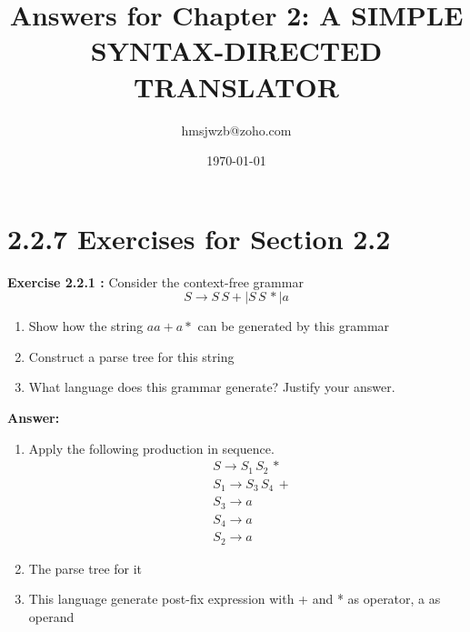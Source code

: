 \documentclass{article}
\title{Answers for Chapter 2: A SIMPLE SYNTAX-DIRECTED TRANSLATOR}
\author{hmsjwzb@zoho.com}
\date{\today}
\begin{document}
	
\maketitle
\newpage
\section*{2.2.7 Exercises for Section 2.2}

\textbf{Exercise 2.2.1 :} Consider the context-free grammar
\[
S \rightarrow S\, S + \mid S\, S\, * \mid a
\]

\begin{enumerate}[label=\alph*)]
	\item Show how the string \(aa+a*\) can be generated by this grammar
	\item Construct a parse tree for this string
	\item What language does this grammar generate? Justify your answer.
\end{enumerate}

\textbf{Answer:}
\begin{enumerate}[label=\textbf{\alph*)}]
	\item Apply the following production in sequence.
	\begin{align*}
		&S \rightarrow S_1\,S_2\,*\\
		&S_1 \rightarrow S_3\,S_4\,+\\
		&S_3 \rightarrow a\\
		&S_4 \rightarrow a\\
		&S_2 \rightarrow a
	\end{align*}

	\item The parse tree for it
	\begin{center}
	\end{center}

	\item This language generate post-fix expression with + and * as operator, a as operand
\end{enumerate}
\newpage
\end{document}

